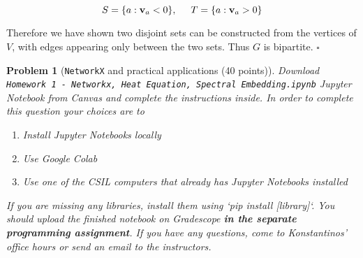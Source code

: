 \documentclass[10pt]{article}
\newcommand{\1}{\vec{\mathbbm{1}}}
\newtheorem{problem}{\sc\color{cit}Problem}
\begin{document}
{\[
S = \{ a : \textbf{v}_a < 0\}, \hspace{5mm} T = \{ a : \textbf{v}_a > 0\}
\]

Therefore we have shown two disjoint sets can be constructed from the vertices of $V$, with edges appearing only between the two sets. Thus $G$ is bipartite. \hfill $\square$
}
\newpage
\begin{problem}[{\tt NetworkX} and practical applications (40 points)]
Download {\tt Homework 1 - Networkx, Heat Equation, Spectral Embedding.ipynb}
Jupyter Notebook from Canvas and complete the instructions inside. In order to
complete this question your choices are to
\begin{enumerate}
\item Install Jupyter Notebooks locally
\item Use Google Colab
\item Use one of the CSIL computers that already has Jupyter Notebooks
installed
\end{enumerate}
If you are missing any libraries, install them using `pip install [library]`. You
should upload the finished notebook on Gradescope {\bf in the separate programming
assignment}.
If you have any questions, come to Konstantinos' office hours or send an email to
the instructors.
\end{problem}
\end{document}
